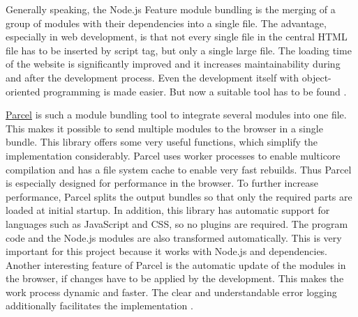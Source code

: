 Generally speaking, the Node.js Feature module bundling is the merging of a group of modules with their dependencies into a single file. The advantage, especially in web development, is that not every single file in the central HTML file has to be inserted by script tag, but only a single large file. The loading time of the website is significantly improved and it increases maintainability during and after the development process. Even the development itself with object-oriented programming is made easier. But now a suitable tool has to be found \cite{Kasireddy2016}. 

\href{https://parceljs.org}{Parcel} is such a module bundling tool to integrate several modules into one file. This makes it possible to send multiple modules to the browser in a single bundle. This library offers some very useful functions, which simplify the implementation considerably. Parcel uses worker processes to enable multicore compilation and has a file system cache to enable very fast rebuilds. Thus Parcel is especially designed for performance in the browser. To further increase performance, Parcel splits the output bundles so that only the required parts are loaded at initial startup. In addition, this library has automatic support for languages such as JavaScript and CSS, so no plugins are required. The program code and the Node.js modules are also transformed automatically. This is very important for this project because it works with Node.js and dependencies. Another interesting feature of Parcel is the automatic update of the modules in the browser, if changes have to be applied by the development. This makes the work process dynamic and faster. The clear and understandable error logging additionally facilitates the implementation \cite{Govett2019}. 

